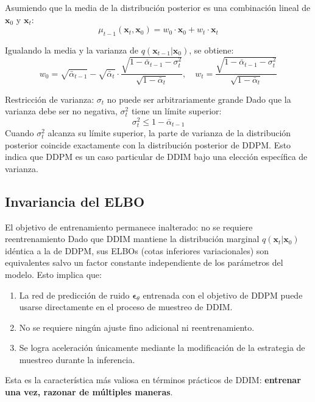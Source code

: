 Asumiendo que la media de la distribución posterior es una combinación lineal de $\mathbf{x}_0$ y $\mathbf{x}_t$:
$$
\mu_{t-1}(\mathbf{x}_t, \mathbf{x}_0) = w_0 \cdot \mathbf{x}_0 + w_t \cdot \mathbf{x}_t
$$

Igualando la media y la varianza de $q(\mathbf{x}_{t-1}|\mathbf{x}_0)$, se obtiene:
$$
w_0 = \sqrt{\bar{\alpha}_{t-1}} - \sqrt{\bar{\alpha}_t} \cdot \frac{\sqrt{1-\bar{\alpha}_{t-1}-\sigma_t^2}}{\sqrt{1-\bar{\alpha}_t}}, \quad
w_t = \frac{\sqrt{1-\bar{\alpha}_{t-1}-\sigma_t^2}}{\sqrt{1-\bar{\alpha}_t}}
$$

\begin{warningbox}{Restricción de varianza: $\sigma_t$ no puede ser arbitrariamente grande}
Dado que la varianza debe ser no negativa, $\sigma_t^2$ tiene un límite superior:
$$
\sigma_t^2 \leq 1 - \bar{\alpha}_{t-1}
$$
Cuando $\sigma_t^2$ alcanza su límite superior, la parte de varianza de la distribución posterior coincide exactamente con la distribución posterior de DDPM. Esto indica que DDPM es un caso particular de DDIM bajo una elección específica de varianza.
\end{warningbox}

\subsection{Invariancia del ELBO}

\begin{importantbox}{El objetivo de entrenamiento permanece inalterado: no se requiere reentrenamiento}
Dado que DDIM mantiene la distribución marginal $q(\mathbf{x}_t|\mathbf{x}_0)$ idéntica a la de DDPM, sus ELBOs (cotas inferiores variacionales) son equivalentes salvo un factor constante independiente de los parámetros del modelo. Esto implica que:
\begin{enumerate}
    \item La red de predicción de ruido $\boldsymbol{\epsilon}_\theta$ entrenada con el objetivo de DDPM puede usarse directamente en el proceso de muestreo de DDIM.
    \item No se requiere ningún ajuste fino adicional ni reentrenamiento.
    \item Se logra aceleración únicamente mediante la modificación de la estrategia de muestreo durante la inferencia.
\end{enumerate}
Esta es la característica más valiosa en términos prácticos de DDIM: \textbf{entrenar una vez, razonar de múltiples maneras}.
\end{importantbox}

